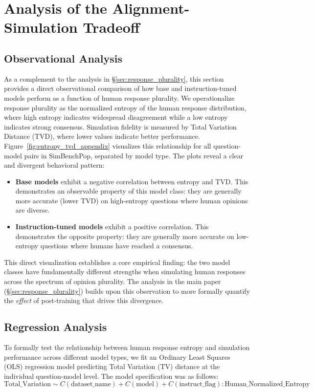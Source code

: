 \documentclass{article} %
\begin{document}
\section{Analysis of the Alignment-Simulation Tradeoff}
\label{app:base_vs_instruct_heatmap}
\subsection{Observational Analysis}
As a complement to the analysis in \S\ref{sec:response_plurality}, this section provides a direct observational comparison of how base and instruction-tuned models perform as a function of human response plurality. We operationalize response plurality as the normalized entropy of the human response distribution, where high entropy indicates widespread disagreement while a low entropy indicates strong consensus. Simulation fidelity is measured by Total Variation Distance (TVD), where lower values indicate better performance. Figure~\ref{fig:entropy_tvd_appendix} visualizes this relationship for all question-model pairs in SimBenchPop, separated by model type. The plots reveal a clear and divergent behavioral pattern:
\begin{itemize}[leftmargin=*]
    \item \textbf{Base models} exhibit a negative correlation between entropy and TVD. This demonstrates an observable property of this model class: they are generally more accurate (lower TVD) on high-entropy questions where human opinions are diverse.
    \item \textbf{Instruction-tuned models} exhibit a positive correlation. This demonstrates the opposite property: they are generally more accurate on low-entropy questions where humans have reached a consensus.
\end{itemize}

This direct visualization establishes a core empirical finding: the two model classes have fundamentally different strengths when simulating human responses across the spectrum of opinion plurality. The analysis in the main paper (\S\ref{sec:response_plurality}) builds upon this observation to more formally quantify the \textit{effect} of post-training that drives this divergence.

\subsection{Regression Analysis}
To formally test the relationship between human response entropy and simulation performance across different model types, we fit an Ordinary Least Squares (OLS) regression model predicting Total Variation (TV) distance at the individual question-model level. The model specification was as follows:
\begin{equation}
\text{Total\_Variation} \sim C(\text{dataset\_name}) + C(\text{model}) + C(\text{instruct\_flag}):\text{Human\_Normalized\_Entropy}
\end{equation}
\end{document}
